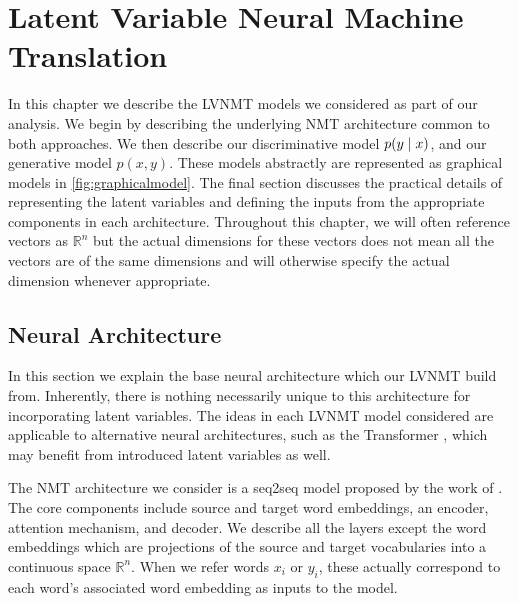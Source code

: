\chapter{Latent Variable Neural Machine Translation}

In this chapter we describe the \ac{LVNMT} models we considered as part of our analysis. We begin by describing the underlying \ac{NMT} architecture common to both approaches. We then describe our discriminative model $p(y \; | \;{x})$, and our generative model $p(x, y)$. These models abstractly are represented as graphical models in \ref{fig:graphicalmodel}. The final section discusses the practical details of representing the latent variables and defining the inputs from the appropriate components in each architecture. Throughout this chapter, we will often reference vectors as $\mathbb{R}^{n}$ but the actual dimensions for these vectors does not mean all the vectors are of the same dimensions and will otherwise specify the actual dimension whenever appropriate. 


\section{Neural Architecture}

In this section we explain the base neural architecture which our \ac{LVNMT} build from. Inherently, there is nothing necessarily unique to this architecture for incorporating latent variables.  The ideas in each \ac{LVNMT} model considered are applicable to alternative neural architectures, such as the Transformer \cite{vaswani2017attentionTransformer}, which may benefit from introduced latent variables as well. 

The \ac{NMT} architecture we consider is a \ac{seq2seq} model proposed by the work of  \citet{bahdanau2014NMTBYJoint}. The core components include source and target word embeddings, an encoder, attention mechanism, and decoder. We describe all the layers except the word embeddings which are projections of the source and target vocabularies into a continuous space $\mathbb{R}^{n}$. When we refer words $x_{i}$ or $y_{i}$, these actually correspond to each word's associated word embedding as inputs to the model.  

